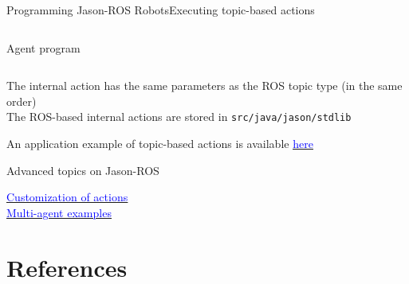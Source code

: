 \documentclass[compress]{beamer}
\newcommand{\link}[2]{\href{#1}{\underline{\textcolor{blue}{#2}}}}
\begin{document}
\begin{frame}[fragile]{Programming Jason-ROS Robots}{Executing topic-based actions}{}
\begin{columns}
\begin{column}{.47\textwidth}
\begin{block}{{\ssmall Agent program}}
\begin{alltt}
\end{alltt}
\end{block}
 \end{column}
\end{columns} 

 {\tiny The internal action has the same parameters as the ROS topic type (in the same order)}\\ 
 
 {\tiny The ROS-based internal actions are stored in \texttt{src/java/jason/stdlib}}
 
 \vfill
 
 {\tiny An application example of topic-based actions is available \link{https://github.com/embedded-mas/jason-ros-course-wesaac2024/tree/main/resources/example_topic_writing_action}{here}}
 
\end{frame}


\begin{frame}{Advanced topics on Jason-ROS}

 \link{https://github.com/embedded-mas/jason-ros-course-wesaac2024/tree/main/resources/example_custom_ia}{
 Customization of actions}\\
 
 \link{https://github.com/embedded-mas/jason-ros-course-wesaac2024/tree/main/resources/example_custom_ia} {Multi-agent examples}
 
\end{frame}



\section{References}
\end{document}
